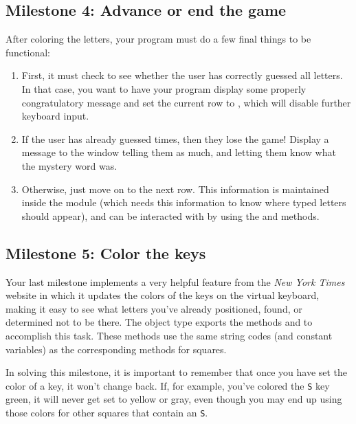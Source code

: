 \documentclass[letterpaper,12pt]{exam}
\begin{document}
\subsection{Milestone 4: Advance or end the game}
After coloring the letters, your program must do a few final things to be functional: 
\begin{enumerate}
	\item First, it must check to see whether the user has correctly guessed all  letters. In that case, you want to have your program display some properly congratulatory message and set the current row to , which will disable further keyboard input.
	\item If the user has already guessed  times, then they lose the game! Display a message to the window telling them as much, and letting them know what the mystery word was.
	\item Otherwise, just move on to the next row. This information is maintained inside the  module (which needs this information to know where typed letters should appear), and can be interacted with by using the  and  methods.
\end{enumerate}

\subsection{Milestone 5: Color the keys}
Your last milestone implements a very helpful feature from the \emph{New York Times} website in which it updates the colors of the keys on the virtual keyboard, making it easy to see what letters you've already positioned, found, or determined not to be there. The  object type exports the methods  and  to accomplish this task. These methods use the same string codes (and constant variables) as the corresponding methods for squares.

In solving this milestone, it is important to remember that once you have set the color of a key, it won't change back. If, for example, you've colored the \texttt{S} key green, it will never get set to yellow or gray, even though you may end up using those colors for other squares that contain an \texttt{S}.
\end{document}
